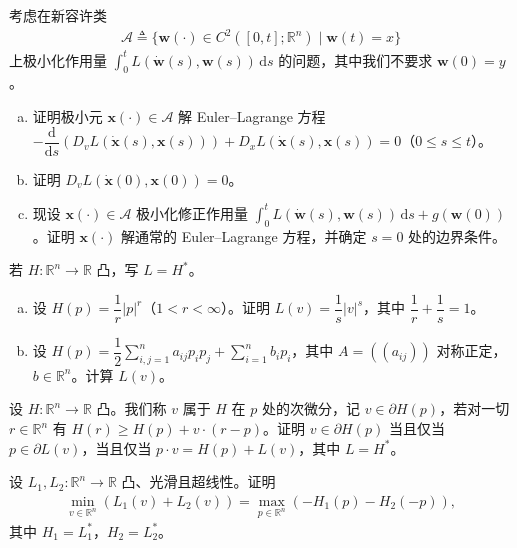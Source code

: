 \documentclass[../../main.tex]{subfiles}
\begin{document}
\begin{exercise}\label{exercise:ch03-9}
考虑在新容许类
\begin{align*}
\mathcal{A}\triangleq\{\mathbf{w}(\cdot)\in C^2([0,t];\mathbb{R}^n)\mid\mathbf{w}(t)=x\}
\end{align*}
上极小化作用量 $\int_0^t L(\dot{\mathbf{w}}(s),\mathbf{w}(s))\,\mathrm{d}s$ 的问题，其中我们不要求 $\mathbf{w}(0)=y$。
\begin{enumerate}[(a)]
\item 证明极小元 $\mathbf{x}(\cdot)\in\mathcal{A}$ 解 Euler--Lagrange 方程 $-\dfrac{\mathrm{d}}{\mathrm{d}s}(D_vL(\dot{\mathbf{x}}(s),\mathbf{x}(s)))+D_xL(\dot{\mathbf{x}}(s),\mathbf{x}(s))=0$（$0\leqslant s\leqslant t$）。
\item 证明 $D_vL(\dot{\mathbf{x}}(0),\mathbf{x}(0))=0$。
\item 现设 $\mathbf{x}(\cdot)\in\mathcal{A}$ 极小化修正作用量 $\int_0^t L(\dot{\mathbf{w}}(s),\mathbf{w}(s))\,\mathrm{d}s+g(\mathbf{w}(0))$。证明 $\mathbf{x}(\cdot)$ 解通常的 Euler--Lagrange 方程，并确定 $s=0$ 处的边界条件。
\end{enumerate}
\end{exercise}

\begin{exercise}\label{exercise:ch03-10}
若 $H:\mathbb{R}^n\to\mathbb{R}$ 凸，写 $L=H^*$。
\begin{enumerate}[(a)]
\item 设 $H(p)=\dfrac{1}{r}|p|^r$（$1<r<\infty$）。证明 $L(v)=\dfrac{1}{s}|v|^s$，其中 $\dfrac{1}{r}+\dfrac{1}{s}=1$。
\item 设 $H(p)=\dfrac{1}{2}\sum_{i,j=1}^n a_{ij}p_ip_j+\sum_{i=1}^n b_i p_i$，其中 $A=((a_{ij}))$ 对称正定，$b\in\mathbb{R}^n$。计算 $L(v)$。
\end{enumerate}
\end{exercise}

\begin{exercise}\label{exercise:ch03-11}
设 $H:\mathbb{R}^n\to\mathbb{R}$ 凸。我们称 $v$ 属于 $H$ 在 $p$ 处的次微分，记 $v\in\partial H(p)$，若对一切 $r\in\mathbb{R}^n$ 有 $H(r)\geqslant H(p)+v\cdot(r-p)$。证明 $v\in\partial H(p)$ 当且仅当 $p\in\partial L(v)$，当且仅当 $p\cdot v=H(p)+L(v)$，其中 $L=H^*$。
\end{exercise}

\begin{exercise}\label{exercise:ch03-12}
设 $L_1,L_2:\mathbb{R}^n\to\mathbb{R}$ 凸、光滑且超线性。证明
\begin{align*}
\min_{v\in\mathbb{R}^n}(L_1(v)+L_2(v))=\max_{p\in\mathbb{R}^n}(-H_1(p)-H_2(-p)),
\end{align*}
其中 $H_1=L_1^*$，$H_2=L_2^*$。
\end{exercise}
\end{document}

